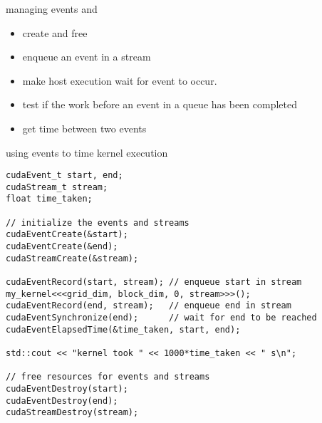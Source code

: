 \begin{frame}[fragile]{}
    \begin{info}{managing events}
         and 
            \begin{itemize}
                \item create and free 
            \end{itemize}
            \begin{itemize}
                \item enqueue an event in a stream
            \end{itemize}
            \begin{itemize}
                \item make host execution wait for event to occur.
            \end{itemize}
            \begin{itemize}
                \item test if the work before an event in a queue has been completed
            \end{itemize}
            \begin{itemize}
                \item get time between two events
            \end{itemize}
    \end{info}
\end{frame}

\begin{frame}[fragile]{}
    \begin{code}{using events to time kernel execution}
        \begin{lstlisting}[style=boxcudatiny]
cudaEvent_t start, end;
cudaStream_t stream;
float time_taken;

// initialize the events and streams
cudaEventCreate(&start);
cudaEventCreate(&end);
cudaStreamCreate(&stream);

cudaEventRecord(start, stream); // enqueue start in stream
my_kernel<<<grid_dim, block_dim, 0, stream>>>();
cudaEventRecord(end, stream);   // enqueue end in stream
cudaEventSynchronize(end);      // wait for end to be reached
cudaEventElapsedTime(&time_taken, start, end);

std::cout << "kernel took " << 1000*time_taken << " s\n";

// free resources for events and streams
cudaEventDestroy(start);
cudaEventDestroy(end);
cudaStreamDestroy(stream);
        \end{lstlisting}
    \end{code}
\end{frame}

